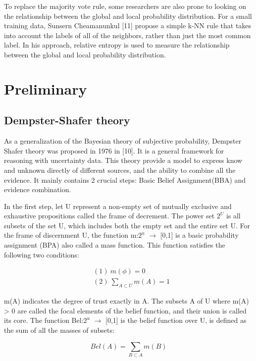 \documentclass[runningheads]{llncs}
\begin{document}
To replace the majority vote rule, some researchers are also prone to looking on the relationship between the global  and local probability distribution. For a small training data, Sunsern Cheamanunkul [11] propose a simple k-NN rule that takes into account the labels of all of the neighbors, rather than just the most common label. In his approach, relative entropy is used to measure the relationship between the global  and local probability distribution.

\section{Preliminary}
\subsection{Dempster-Shafer theory}
As a generalization of the Bayesian theory of subjective probability, Dempster Shafer theory was proposed in 1976 in [10]. It is a general framework for reasoning with uncertainty data. This theory provide a model to express know and unknown directly of different sources, and the ability to combine all the evidence. It mainly contains 2 crucial steps: Basic Belief Assignment(BBA) and evidence combination.

In the first step, let U represent a non-empty set of mutually exclusive and exhaustive propositions called the frame of decrement. The power set $2^{U}$ is all subsets of the set U, which includes both the empty set  and the entire set U. For the frame of discernment U, the function m:$2^{u}$ $\rightarrow$ [0,1] is a basic probability assignment (BPA) also called a mass function. This function satisfies the following two conditions: 

\begin{equation}
\begin{split}
&(1)\ m(\phi) = 0\\&(2)\ \sum_{A\subset U}m(A) = 1
\end{split}
\end{equation}

m(A) indicates the degree of trust exactly in A. The subsets A of U where m(A) > 0 are called the focal elements of the belief function, and their union is called its core. The function Bel:$2^{u}$ $\rightarrow$ [0,1] is the belief function over U, is defined as the sum of all the masses of subsets:

\begin{equation}
Bel(A) = \sum_{B\subset A}m(B)
\end{equation}
\end{document}
